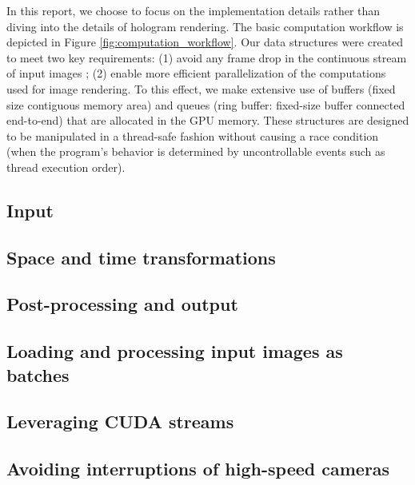 

In this report, we choose to focus on the implementation details rather than diving into the details of hologram rendering. The basic computation workflow is depicted in Figure \ref{fig:computation_workflow}. Our data structures were created to meet two key requirements: (1) avoid any frame drop in the continuous stream of input images ; (2) enable more efficient parallelization of the computations used for image rendering. To this effect, we make extensive use of buffers (fixed size contiguous memory area) and queues (ring buffer: fixed-size buffer connected end-to-end) that are allocated in the GPU memory. These structures are designed to be manipulated in a thread-safe fashion without causing a race condition (when the program's behavior is determined by uncontrollable events such as thread execution order).

\subsection{Input}


\subsection{Space and time transformations}


\subsection{Post-processing and output}


\subsection{Loading and processing input images as batches}


\subsection{Leveraging CUDA streams}


\subsection{Avoiding interruptions of high-speed cameras}


